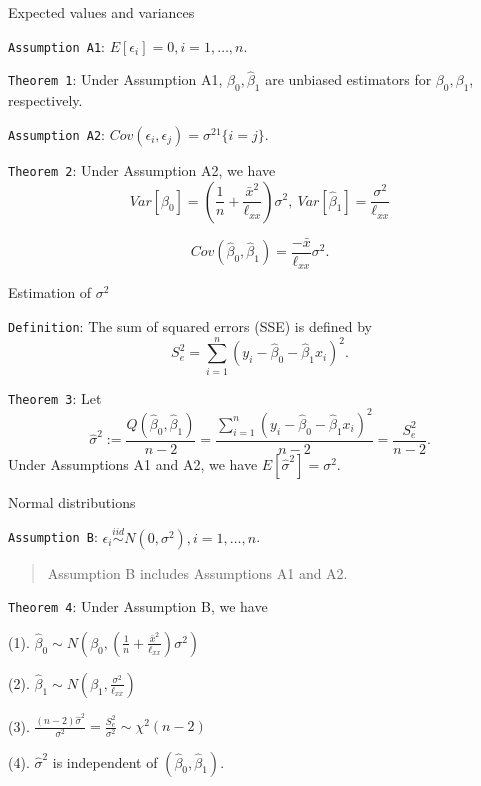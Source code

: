 \documentclass[ignorenonframetext,]{beamer}
\begin{document}
\begin{frame}[fragile]{Expected values and variances}
\protect\hypertarget{expected-values-and-variances}{}

\texttt{Assumption\ A1}: \(E[\epsilon_i]=0,i=1,\dots,n\).

\texttt{Theorem\ 1}: Under Assumption A1, \(\hat\beta_0,\hat\beta_1\)
are unbiased estimators for \(\beta_0,\beta_1\), respectively.

\texttt{Assumption\ A2}:
\(Cov(\epsilon_i,\epsilon_j)=\sigma^21\{i=j\}\).

\texttt{Theorem\ 2}: Under Assumption A2, we have
\[Var[\hat\beta_0] = \left(\frac 1n+\frac{\bar x^2}{\ell_{xx}}\right)\sigma^2,\ Var[\hat\beta_1] =\frac{\sigma^2}{\ell_{xx}}\]

\[Cov(\hat\beta_0,\hat\beta_1) = \frac{-\bar x}{\ell_{xx}}\sigma^2.\]

\end{frame}

\begin{frame}[fragile]{Estimation of \(\sigma^2\)}
\protect\hypertarget{estimation-of-sigma2}{}

\texttt{Definition}: The sum of squared errors (SSE) is defined by
\[S_e^2 = \sum_{i=1}^n(y_i-\hat\beta_0-\hat\beta_1x_i)^2.\]

\texttt{Theorem\ 3}: Let
\[\hat{\sigma}^2 := \frac{Q(\hat \beta_0,\hat\beta_1)}{n-2}=\frac{\sum_{i=1}^n(y_i-\hat\beta_0-\hat\beta_1x_i)^2}{n-2}=\frac{S_e^2}{n-2}.\]
Under Assumptions A1 and A2, we have \(E[\hat\sigma^2]=\sigma^2\).

\end{frame}

\begin{frame}[fragile]{Normal distributions}
\protect\hypertarget{normal-distributions}{}

\texttt{Assumption\ B}:
\(\epsilon_i\stackrel{iid}{\sim}N(0,\sigma^2),i=1,\dots,n\).

\begin{quote}
Assumption B includes Assumptions A1 and A2.
\end{quote}

\texttt{Theorem\ 4}: Under Assumption B, we have

(1).
\(\hat\beta_0\sim N(\beta_0,(\frac 1n+\frac{\bar x^2}{\ell_{xx}})\sigma^2)\)

(2). \(\hat\beta_1\sim N(\beta_1,\frac{\sigma^2}{\ell_{xx}})\)

(3).
\(\frac{(n-2)\hat\sigma^2}{\sigma^2}=\frac{S_e^2}{\sigma^2}\sim \chi^2(n-2)\)

(4). \(\hat\sigma^2\) is independent of \((\hat\beta_0,\hat\beta_1)\).

\end{frame}
\end{document}
